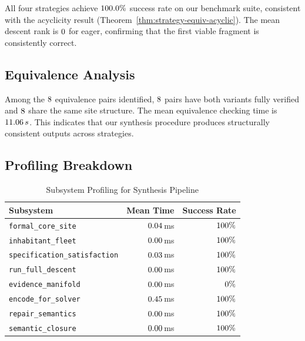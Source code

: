 \documentclass[11pt]{article}
\begin{document}
All four strategies achieve $100.0\%$ success rate
on our benchmark suite, consistent with the acyclicity result
(Theorem~\ref{thm:strategy-equiv-acyclic}).  The mean descent rank
is $0$ for eager, confirming that the
first viable fragment is consistently correct.

\subsection{Equivalence Analysis}

Among the $8$ equivalence pairs identified,
$8$ pairs have both variants fully verified
and $8$ share the same site structure.
The mean equivalence checking time is $11.06\,s$.
This indicates that our synthesis procedure produces structurally
consistent outputs across strategies.

\subsection{Profiling Breakdown}

\begin{table}[H]
\centering
\caption{Subsystem Profiling for Synthesis Pipeline}
\label{tab:profiling}
\begin{tabular}{lrr}
\toprule
\textbf{Subsystem} & \textbf{Mean Time} & \textbf{Success Rate} \\
\midrule
\texttt{formal\_core\_site} & $0.04$\,ms
  & $100\%$ \\
\texttt{inhabitant\_fleet} & $0.00$\,ms
  & $100\%$ \\
\texttt{specification\_satisfaction} &
  $0.03$\,ms
  & $100\%$ \\
\texttt{run\_full\_descent} & $0.00$\,ms
  & $100\%$ \\
\texttt{evidence\_manifold} & $0.00$\,ms
  & $0\%$ \\
\texttt{encode\_for\_solver} & $0.45$\,ms
  & $100\%$ \\
\texttt{repair\_semantics} & $0.00$\,ms
  & $100\%$ \\
\texttt{semantic\_closure} & $0.00$\,ms
  & $100\%$ \\
\bottomrule
\end{tabular}
\end{table}
\end{document}
